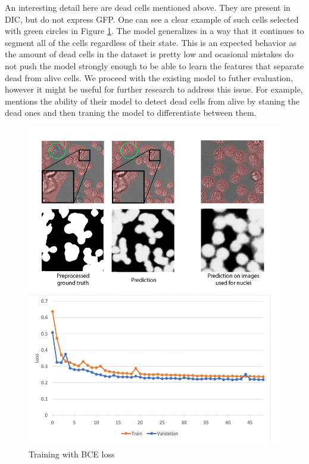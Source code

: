 An interesting detail here are dead cells mentioned above. They are present in DIC, but do not express GFP. One can see a clear example of such cells selected with green circles in Figure \ref{fig:gfp-bce-predictions}. The model generalizes in a way that it continues to segment all of the cells regardless of their state. This is an expected behavior as the amount of dead cells in the dataset is pretty low and ocasional mistakes do not push the model strongly enough to be able to learn the features that separate dead from alive cells. We proceed with the existing model to futher evaluation, however it might be useful for further research to address this issue. For example, \cite{Christiansen_2018} mentions the ability of their model to detect dead cells from alive by staning the dead ones and then traning the model to differentiate between them.

\begin{figure}[H]
	\begin{center}
		\includegraphics[width=0.7\linewidth]{bilder/gfp/binary-bce/enlarged.png}
		\caption{Training with BCE loss}\label{fig:gfp-bce-predictions}
	\end{center}
\end{figure}
